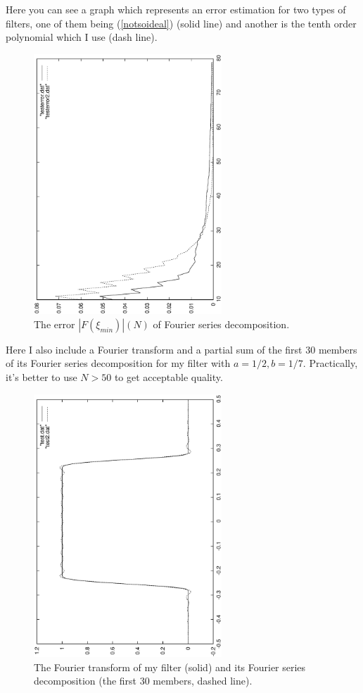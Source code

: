 \documentclass[a4paper,11pt,fleqn]{article}
\let\oldref\ref
\renewcommand{\ref}[1]{(\oldref{#1})}
\begin{document}
Here you can see a graph which represents an error estimation for two types of filters, one of them being \ref{notsoideal} (solid line) and another is the tenth order polynomial which I use (dash line).
\begin{figure}[h]
\includegraphics[width=200pt,angle=-90]{error.ps}
\caption{The error $\left|F(\xi_{min})\right|(N)$ of Fourier series decomposition.}
\end{figure}

Here I also include a Fourier transform and a partial sum of the first 30 members of its Fourier series decomposition for my filter with $a=1/2, b=1/7$. Practically, it's better to use $N>50$ to get acceptable
quality.
\begin{figure}[h]
\includegraphics[width=200pt,angle=-90]{approx.ps}
\caption{The Fourier transform of my filter (solid) and its Fourier series decomposition (the first 30 members, dashed line).}
\end{figure}
\end{document}
